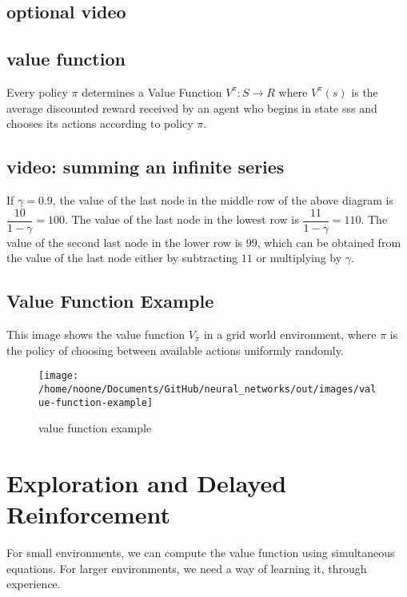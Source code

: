 \documentclass[11pt]{article}
\begin{document}
\subsection{optional video}\label{subsec:optional-video4}

\subsection{value function}\label{subsec:value-function}
Every policy $\pi$ determines a Value Function $V^{\pi}: S \to R$ where
$V^{\pi}(s)$ is the average discounted reward received by an agent who begins
in state sss and chooses its actions according to policy $\pi$.

\subsection{video: summing an infinite series}\label{subsec:summing-an-infinite-series}
If $\gamma = 0.9$, the value of the last node in the middle row of the above
diagram is $\dfrac{10}{1 - \gamma} = 100$.
The value of the last node in the lowest row is $\dfrac{11}{1 - \gamma} = 110$.
The value of the second last node in the lower row is $99$, which can be
obtained from the value of the last node either by subtracting $11$ or
multiplying by $\gamma$.

\subsection{Value Function Example}\label{subsec:value-function-example}
This image shows the value function $V_{\pi}$ in a grid world environment,
where $\pi$ is the policy of choosing between available actions uniformly
randomly.

\begin{figure}[h]
    \centering
    \texttt{[image: /home/noone/Documents/GitHub/neural\_networks/out/images/value-function-example]}
    \caption[value function example]{value function example}
    \label{fig:value function example}
\end{figure}

\section{Exploration and Delayed Reinforcement}\label{sec:exploration-and-delayed-reinforcement}

For small environments, we can compute the value function using simultaneous
equations.
For larger environments, we need a way of learning it, through experience.
\end{document}
